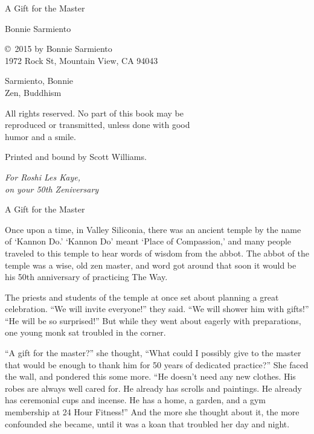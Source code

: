 \documentclass{book}
\renewcommand{\chapter}[1]{
  \cleardoublepage
  \vspace*{1in}
  {\par\noindent\raggedright \Large #1\par}
  \vspace*{.5in}
}
\begin{document}
\pagestyle{empty}
\frontmatter
\begin{titlepage}
  \Large
  A Gift for the Master

  \bigskip

  Bonnie Sarmiento
\end{titlepage}

\begin{colophon}
  \copyright\ 2015 by Bonnie Sarmiento\\
  1972 Rock St, Mountain View, CA 94043

  Sarmiento, Bonnie\\
  Zen, Buddhism

  All rights reserved. No part of this book may be\\
  reproduced or transmitted, unless done with good\\
  humor and a smile.

  Printed and bound by Scott Williams.
\end{colophon}

\begin{dedication}
  \null\vfill\em
  For Roshi Les Kaye,\\
  on your 50th Zeniversary
  \vfill\null
\end{dedication}

\mainmatter
\pagestyle{plain}

\chapter{A Gift for the Master}

Once upon a time, in Valley Siliconia, there was an ancient temple by the name
of `Kannon Do.' `Kannon Do' meant `Place of Compassion,' and many people
traveled to this temple to hear words of wisdom from the abbot. The abbot of
the temple was a wise, old zen master, and word got around that soon it would
be his 50th anniversary of practicing The Way.

The priests and students of the temple at once set about planning a great
celebration. ``We will invite everyone!'' they said. ``We will shower him with
gifts!'' ``He will be so surprised!'' But while they went about eagerly with
preparations, one young monk sat troubled in the corner.

\pagebreak

``A gift for the master?'' she thought, ``What could I possibly give to the
master that would be enough to thank him for 50 years of dedicated practice?''
She faced the wall, and pondered this some more. ``He doesn't need any new
clothes.  His robes are always well cared for. He already has scrolls and
paintings. He already has ceremonial cups and incense. He has a home, a garden,
and a gym membership at 24 Hour Fitness!'' And the more she thought about it,
the more confounded she became, until it was a koan that troubled her day and
night. 
\end{document}
